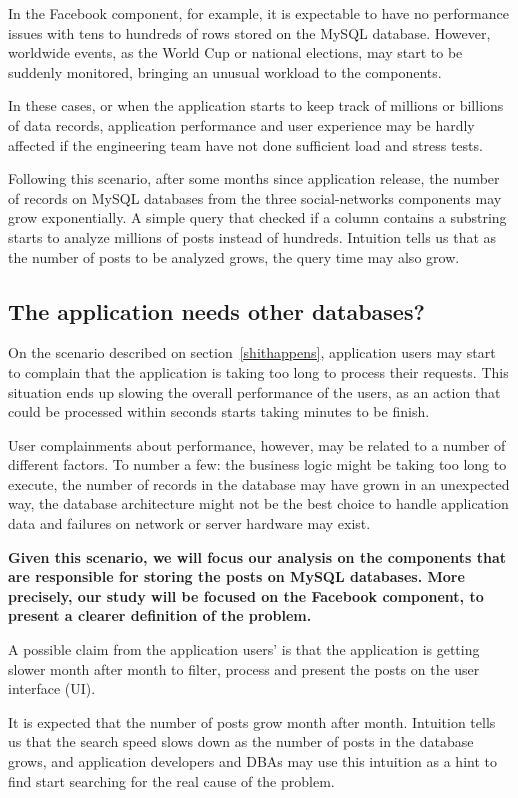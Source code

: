 In the Facebook component, for example, it is expectable to have no performance issues with tens to hundreds of rows stored on the MySQL database. However, worldwide events, as the World Cup or national elections, may start to be suddenly monitored, bringing an unusual workload to the components.  

In these cases, or when the application starts to keep track of millions or billions of data records, application performance and user experience may  be hardly affected if the engineering team have not done sufficient load and stress tests.   

Following this scenario, after some months since application release, the number of records on MySQL databases from the three social-networks components may grow exponentially. A simple query that checked if a column contains a substring starts to analyze millions of posts instead of hundreds. Intuition tells us that as the number of posts to be analyzed grows, the query time may also grow.

\subsection{The application needs other databases?}
\label{anotherdb}
On the scenario described on section~\ref{shithappens}, application users may start to complain that the application is taking too long to process their requests. This situation ends up slowing the overall performance of the users, as an action that could be processed within seconds starts taking minutes to be finish.  

User complainments about performance, however, may be related to a number of different factors. To number a few: the business logic might be taking too long to execute, the number of records in the database may have grown in an unexpected way, the database architecture might not be the best choice to handle application data and failures on network or server hardware may exist. 

\textbf{Given this scenario, we will focus our analysis on the components that are responsible for storing the posts on MySQL databases. More precisely, our study will be focused on the Facebook component, to present a clearer definition of the problem.}

A possible claim from the application users' is that the application is getting slower month after month to filter, process and present the posts on  the user interface (UI). 

It is expected that the number of posts grow month after month. Intuition tells us that the search speed slows down as the number of posts in the database grows, and application developers and DBAs may use this intuition as a hint to find start searching for the real cause of the problem. 

